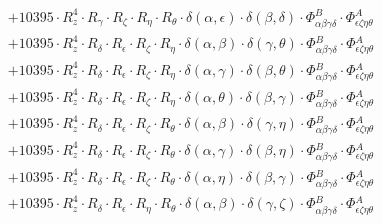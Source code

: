 \documentclass{article}
\begin{document}
\begin{equation}
\begin{array}{c}
 \\[0.2em] 		 + 10395 \cdot R_{z}^{4} \cdot R_{\gamma{}} \cdot R_{\zeta{}} \cdot R_{\eta{}} \cdot R_{\theta{}} \cdot \delta{}\left(\alpha{}, \epsilon{}\right) \cdot \delta{}\left(\beta{}, \delta{}\right) \cdot \Phi{}^{B}_{\alpha{}\beta{}\gamma{}\delta{}} \cdot \Phi{}^{A}_{\epsilon{}\zeta{}\eta{}\theta{}} 
 \\[0.2em] 		 + 10395 \cdot R_{z}^{4} \cdot R_{\delta{}} \cdot R_{\epsilon{}} \cdot R_{\zeta{}} \cdot R_{\eta{}} \cdot \delta{}\left(\alpha{}, \beta{}\right) \cdot \delta{}\left(\gamma{}, \theta{}\right) \cdot \Phi{}^{B}_{\alpha{}\beta{}\gamma{}\delta{}} \cdot \Phi{}^{A}_{\epsilon{}\zeta{}\eta{}\theta{}} 
 \\[0.2em] 		 + 10395 \cdot R_{z}^{4} \cdot R_{\delta{}} \cdot R_{\epsilon{}} \cdot R_{\zeta{}} \cdot R_{\eta{}} \cdot \delta{}\left(\alpha{}, \gamma{}\right) \cdot \delta{}\left(\beta{}, \theta{}\right) \cdot \Phi{}^{B}_{\alpha{}\beta{}\gamma{}\delta{}} \cdot \Phi{}^{A}_{\epsilon{}\zeta{}\eta{}\theta{}} 
 \\[0.2em] 		 + 10395 \cdot R_{z}^{4} \cdot R_{\delta{}} \cdot R_{\epsilon{}} \cdot R_{\zeta{}} \cdot R_{\eta{}} \cdot \delta{}\left(\alpha{}, \theta{}\right) \cdot \delta{}\left(\beta{}, \gamma{}\right) \cdot \Phi{}^{B}_{\alpha{}\beta{}\gamma{}\delta{}} \cdot \Phi{}^{A}_{\epsilon{}\zeta{}\eta{}\theta{}} 
 \\[0.2em] 		 + 10395 \cdot R_{z}^{4} \cdot R_{\delta{}} \cdot R_{\epsilon{}} \cdot R_{\zeta{}} \cdot R_{\theta{}} \cdot \delta{}\left(\alpha{}, \beta{}\right) \cdot \delta{}\left(\gamma{}, \eta{}\right) \cdot \Phi{}^{B}_{\alpha{}\beta{}\gamma{}\delta{}} \cdot \Phi{}^{A}_{\epsilon{}\zeta{}\eta{}\theta{}} 
 \\[0.2em] 		 + 10395 \cdot R_{z}^{4} \cdot R_{\delta{}} \cdot R_{\epsilon{}} \cdot R_{\zeta{}} \cdot R_{\theta{}} \cdot \delta{}\left(\alpha{}, \gamma{}\right) \cdot \delta{}\left(\beta{}, \eta{}\right) \cdot \Phi{}^{B}_{\alpha{}\beta{}\gamma{}\delta{}} \cdot \Phi{}^{A}_{\epsilon{}\zeta{}\eta{}\theta{}} 
 \\[0.2em] 		 + 10395 \cdot R_{z}^{4} \cdot R_{\delta{}} \cdot R_{\epsilon{}} \cdot R_{\zeta{}} \cdot R_{\theta{}} \cdot \delta{}\left(\alpha{}, \eta{}\right) \cdot \delta{}\left(\beta{}, \gamma{}\right) \cdot \Phi{}^{B}_{\alpha{}\beta{}\gamma{}\delta{}} \cdot \Phi{}^{A}_{\epsilon{}\zeta{}\eta{}\theta{}} 
 \\[0.2em] 		 + 10395 \cdot R_{z}^{4} \cdot R_{\delta{}} \cdot R_{\epsilon{}} \cdot R_{\eta{}} \cdot R_{\theta{}} \cdot \delta{}\left(\alpha{}, \beta{}\right) \cdot \delta{}\left(\gamma{}, \zeta{}\right) \cdot \Phi{}^{B}_{\alpha{}\beta{}\gamma{}\delta{}} \cdot \Phi{}^{A}_{\epsilon{}\zeta{}\eta{}\theta{}} 

\end{array}
\end{equation}
\end{document}
